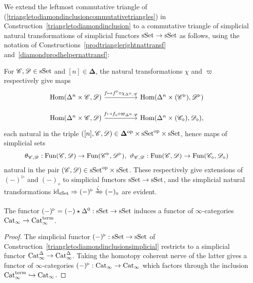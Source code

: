 \documentclass{tac}
\newcommand{\s}[1]{\mathscr{#1}}
\newcommand{\maybehat}[1]{#1} %
\newcommand{\tx}[1]{\textnormal{#1}}
\newcommand{\db}{\mathbf{\Delta}}
\newcommand{\dop}{\mathbf{\Delta}^{\textrm{op}}}
\begin{document}
\begin{construction}\label{triangletodiamondinclusionsimplicial} We extend the leftmost commutative triangle of (\ref{triangletodiamondinclusioncommutativetriangles}) in Construction~\ref{triangletodiamondinclusion} to a commutative triangle of simplicial natural transformations of simplicial functors $\tx{sSet} \to \tx{sSet}$ as follows, using the notation of Constructions~\ref{prodtrianglerightnattransf} and~\ref{diamondprodhelpernattransf}:

For $\s{C}, \s{D} \in \tx{sSet}$ and $[n] \in \db$, the natural transformations $\chi$ and $\varpi$ respectively give maps
\[ \begin{tikzcd} 
\tx{Hom} (\Delta^n \times \s{C}, \s{D} ) \arrow[]{rr}{f \mapsto f^\triangleright \circ \chi_{\Delta^n ,\s{C}}} & & \tx{Hom} ( \Delta^n \times (\s{C}^\triangleright) , \s{D}^\triangleright  ) \\[-0.5em]
\tx{Hom} (\Delta^n \times \s{C}, \s{D} ) \arrow[]{rr}{f \mapsto f_\diamond \circ \varpi_{\Delta^n ,\s{C}}} & & \tx{Hom} ( \Delta^n \times (\s{C}_\diamond) , \s{D}_\diamond  ),
\end{tikzcd}\]
each natural in the triple $\left( [n] , \s{C}, \s{D} \right) \in \dop \times \tx{sSet}^\tx{op} \times \tx{sSet}$, hence maps of simplicial sets \[\theta_{\s{C},\s{D}}  : \tx{Fun}(\s{C} , \s{D}) \to \tx{Fun}(\s{C}^\triangleright , \s{D}^\triangleright), \tx{ } \vartheta_{\s{C},\s{D}}  : \tx{Fun}(\s{C} , \s{D}) \to \tx{Fun}(\s{C}_\diamond , \s{D}_\diamond ) \] natural in the pair $( \s{C}, \s{D})\in \tx{sSet}^\tx{op}\times \tx{sSet}$.  These respectively give extensions of $(-)^\triangleright$ and $(-)_\diamond$ to simplicial functors $\tx{sSet}\to\tx{sSet}$, and the simplicial natural transformations $\tx{id}_{\tx{sSet}} \Rightarrow (-)^\triangleright \xRightarrow{\zeta} (-)_\diamond$ are evident.
\end{construction}
\begin{lemma}\label{coningsimplfunctor} The functor $(-)^\triangleright = (-)\star \Delta^0 : \tx{sSet}\to \tx{sSet}$ induces a functor of $\infty$-categories $\maybehat{\tx{Cat}}_\infty \to\maybehat{\tx{Cat}}_\infty^\tx{term}$.
\end{lemma}
\begin{proof} The simplicial functor $(-)^\triangleright : \tx{sSet}\to \tx{sSet}$ of Construction~\ref{triangletodiamondinclusionsimplicial} restricts to a simplicial functor $\tx{Cat}_\infty^\Delta \to \tx{Cat}_\infty^\Delta$.  Taking the homotopy coherent nerve of the latter gives a functor of $\infty$-categories $(-)^\triangleright : \tx{Cat}_\infty \to \tx{Cat}_\infty$ which factors through the inclusion $\tx{Cat}_\infty^\tx{term} \hookrightarrow \tx{Cat}_\infty$.
\end{proof}
\end{document}
